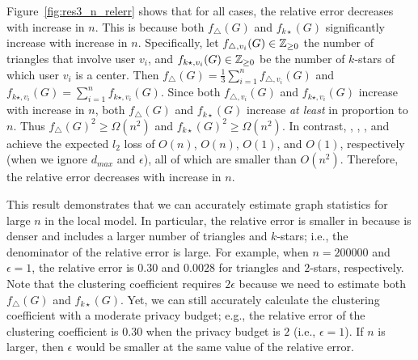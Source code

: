 Figure~\ref{fig:res3_n_relerr} shows that for all cases, the relative error decreases with increase in $n$. 
This is because both $f_\triangle(G)$ and $f_{k\star}(G)$ significantly increase with increase in $n$. 
Specifically, let $f_{\triangle,v_i}(G) \in \mathbb{Z}_{\ge0}$ the number of triangles that involve user $v_i$, and $f_{k\star,v_i}(G) \in \mathbb{Z}_{\ge0}$ be the number of $k$-stars of which user $v_i$ is a center. 
Then $f_\triangle(G) = \frac{1}{3}\sum_{i=1}^n f_{\triangle,v_i}(G)$ and $f_{k\star,v_i}(G) = \sum_{i=1}^n f_{k\star,v_i}(G)$. 
Since both $f_{\triangle,v_i}(G)$ and $f_{k\star,v_i}(G)$ increase with increase in $n$, both $f_\triangle(G)$ and $f_{k\star}(G)$ increase \textit{at least} in proportion to $n$. 
Thus $f_\triangle(G)^2 \geq \Omega(n^2)$ and $f_{k\star}(G)^2 \geq \Omega(n^2)$. 
In contrast, , , , and  achieve the expected $l_2$ loss of $O(n)$, $O(n)$, $O(1)$, and $O(1)$, respectively (when we ignore $d_{max}$ and $\epsilon$), all of which are smaller than $O(n^2)$. 
Therefore, the relative error decreases with increase in $n$. 

This result demonstrates that we can accurately estimate graph statistics for large $n$ in the local model. 
In particular, the relative error is smaller in \IMDB{} 
because \IMDB{} is denser and includes a larger number of triangles and $k$-stars; i.e., the denominator of the relative error is large. 
For example, when $n=200000$ and $\epsilon=1$, the relative error is 
$0.30$ and 
$0.0028$ 
for triangles and $2$-stars, 
respectively. 
Note that the clustering coefficient requires $2\epsilon$ 
because we need to estimate both $f_\triangle(G)$ and $f_{k\star}(G)$. 
Yet, we can still accurately calculate the clustering coefficient with a moderate privacy budget; 
e.g., the relative error of the clustering coefficient is 
$0.30$ 
when the privacy budget is $2$ (i.e., $\epsilon = 1$).
If $n$ is larger, then $\epsilon$ would be smaller at the same value of the relative error. 

